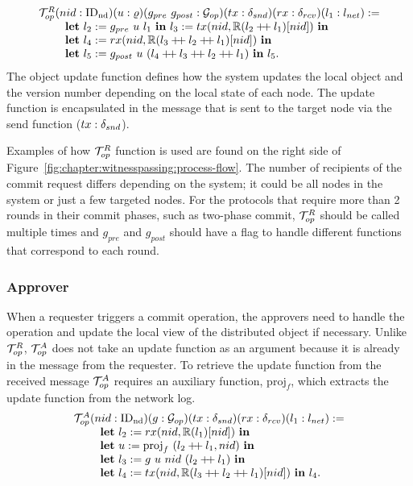 $$
\begin{array}{l}
\opfunction (nid: \nodeid) (u : \updatefunc) (g_{pre}\ g_{post}:  \gopfunction)
	(tx: \sendfunction)
	(rx: \recvfunction)
	(l_1  :\networklog ) := \\
\ \ \ \ \ \ \ \mbox{\textbf{let}} \ l_2 := g_{pre}\ u \ l_1  \ \mbox{\textbf{in}}\   l_3 := tx(nid, \replay(l_2 \mdoubleplus l_1)[nid]) \ \mbox{\textbf{in}}  \\
\ \ \ \ \ \ \ \mbox{\textbf{let}} \ l_4 := rx(nid, \replay(l_3 \mdoubleplus l_2 \mdoubleplus l_1)[nid]) \
	\mbox{\textbf{in}} \\
\ \ \ \ \ \ \ \mbox{\textbf{let}} \ l_5 := 	 g_{post}\  u \ (l_4 \mdoubleplus l_3 \mdoubleplus l_2 \mdoubleplus l_1) \ \mbox{\textbf{in}}\ l_5.
\end{array}
$$
The object update function defines how the system updates the local object and
the version number depending on the local state of each node.
The update function is encapsulated in the message that is sent to the target node
via the send function ($tx : \delta_{snd}$).

Examples of how $\mathcal{T}^{R}_{op}$ function is used are found on the right side
of Figure~\ref{fig:chapter:witnesspassing:process-flow}. The number of recipients of the commit request differs depending
on the system; it could be all nodes in the system or just a few targeted nodes.
For the protocols that require more than 2 rounds in their commit phases, such as 
two-phase commit, $\mathcal{T}^{R}_{op}$ should be called multiple times and $g_{pre}$ and
$g_{post}$ should have a flag to handle different functions that correspond to
each round. 

\subsubsection{Approver}
When a requester triggers a commit operation, the approvers need to
handle the operation and update the local view of the distributed object if
necessary. Unlike $\mathcal{T}^{R}_{op}$, $\mathcal{T}^{A}_{op}$ does not take an update function as an argument
because it is already in the message from the requester.
To retrieve the update function from the received message $\mathcal{T}^{A}_{op}$ requires
an auxiliary function, $\mathrm{proj}_{f}$, which extracts the update function from the network log.
$$
\begin{array}{l}
	\mathcal{T}^{A}_{op} (nid: \mathrm{ID_{nd}}) (g:  \mathcal{G}_{op})
	(tx: \delta_{snd})(rx: \delta_{rcv})(l_1  :{l_{net}} ) := \\
\ \ \ \ \ \ \ \mbox{\textbf{let}} \ l_2 := rx(nid, \mathbb{R}(l_1)[nid]) \
  \mbox{\textbf{in}} \\
\ \ \ \ \ \ \ \mbox{\textbf{let}} \ u := \mathrm{proj}_{f} \ (l_2 \mathbin{+\mkern-4mu+} l_1, nid) \
  \mbox{\textbf{in}} \\
\ \ \ \ \ \ \ \mbox{\textbf{let}}\ l_3  := g\ u\ nid \ (l_2 \mathbin{+\mkern-4mu+} l_1) \ \mbox{\textbf{in}} \\
\ \ \ \ \ \ \ \mbox{\textbf{let}} \ l_4 := tx(nid, \mathbb{R}(l_3 \mathbin{+\mkern-4mu+} l_2 \mathbin{+\mkern-4mu+} l_1)[nid]) \ \mbox{\textbf{in}}  \ l_4.
   \\
\end{array}
$$

